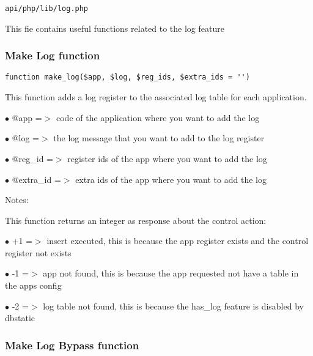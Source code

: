 \documentclass[a4paper]{article}
\begin{document}
\begin{lstlisting}
api/php/lib/log.php
\end{lstlisting}

This fie contains useful functions related to the log feature

\hypertarget{toc489}{}
\subsubsection{Make Log function}

\begin{lstlisting}
function make_log($app, $log, $reg_ids, $extra_ids = '')
\end{lstlisting}

This function adds a log register to the associated log table for each
application.

\begin{compactitem}
\item[\color{myblue}$\bullet$] @app      =$>$ code of the application where you want to add the log
\item[\color{myblue}$\bullet$] @log      =$>$ the log message that you want to add to the log register
\item[\color{myblue}$\bullet$] @reg\_id   =$>$ register ids of the app where you want to add the log
\item[\color{myblue}$\bullet$] @extra\_id =$>$ extra ids of the app where you want to add the log
\end{compactitem}

Notes:

This function returns an integer as response about the control action:

\begin{compactitem}
\item[\color{myblue}$\bullet$] +1 =$>$ insert executed, this is because the app register exists and the control register not exists
\item[\color{myblue}$\bullet$] -1 =$>$ app not found, this is because the app requested not have a table in the apps config
\item[\color{myblue}$\bullet$] -2 =$>$ log table not found, this is because the has\_log feature is disabled by dbstatic
\end{compactitem}

\hypertarget{toc490}{}
\subsubsection{Make Log Bypass function}
\end{document}
